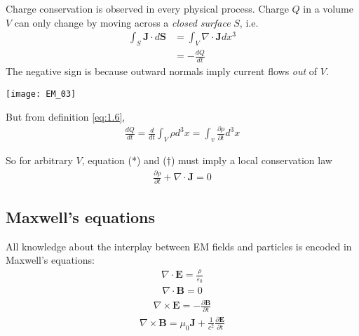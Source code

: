 \documentclass[a4paper]{article}
\begin{document}
Charge conservation is observed in every physical process. Charge $Q$ in a volume $V$ can only change by moving across a \emph{closed surface} $S$, i.e.
\begin{equation*}\tag{*}
\begin{aligned}
\int_S \mathbf{J} \cdot d\mathbf{S} &= \int_V \nabla \cdot \mathbf{J} dx^3\\
&= -\frac{dQ}{dt}
\end{aligned}
\end{equation*}
The negative sign is because outward normals imply current flows \emph{out} of $V$.

\texttt{[image: EM\_03]}

But from definition \ref{eq:1.6},
\begin{equation*}\tag{$\dagger$}
\begin{aligned}
\frac{dQ}{dt} = \frac{d}{dt}\int_V \rho d^3 x = \int_v \frac{\partial \rho}{\partial t} d^3 x
\end{aligned}
\end{equation*}

So for arbitrary $V$, equation (*) and ($\dagger$) must imply a local conservation law
\begin{equation*}\tag{1.11} \label{eq:1.11}
\begin{aligned}
\frac{\partial \rho}{\partial t} + \nabla \cdot \mathbf{J} = 0
\end{aligned}
\end{equation*}

\subsection{Maxwell's equations}
All knowledge about the interplay between EM fields and particles is encoded in Maxwell's equations:
\begin{equation*}\tag{Gauss' Law, 1.12} \label{eq:1.12}
\begin{aligned}
\nabla \cdot \mathbf{E} = \frac{\rho}{\varepsilon_0}
\end{aligned}
\end{equation*}
\begin{equation*}\tag{Gauss' Law for magnetism, 1.13} \label{eq:1.13}
\begin{aligned}
\nabla \cdot \mathbf{B} = 0
\end{aligned}
\end{equation*}
\begin{equation*}\tag{Faraday's law of induction, 1.14} \label{eq:1.14}
\begin{aligned}
\nabla \times \mathbf{E} = -\frac{\partial \mathbf{B}}{\partial t}
\end{aligned}
\end{equation*}
\begin{equation*}\tag{Ampere-Maxwell Law, 1.15} \label{eq:1.15}
\begin{aligned}
\nabla \times \mathbf{B} = \mu_0 \mathbf{J} + \frac{1}{c^2} \frac{\partial \mathbf{E}}{\partial t}
\end{aligned}
\end{equation*}
\end{document}
